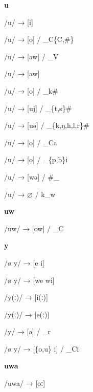 \begin{center}\textbf{u}\end{center}
\begin{multicols}{4}
\noindent /u/ → [i]

\noindent /u/ → [o] / \_C\{C,\#\}

\noindent /u/ → [əw] / \_V

\noindent /u/ → [aw]

\noindent /u/ → [o] / \_k\#

\noindent /u/ → [uj] / \_\{t,s\}\#

\noindent /u/ → [uə] / \_\{k,ŋ,h,l,r\}\#

\noindent /u/ → [o] / \_Ca

\noindent /u/ → [o] / \_\{p,b\}i

\noindent /u/ → [wə] / \#\_

\noindent /u/ → $\varnothing$ / k\_w
\end{multicols}

\begin{center}\textbf{uw}\end{center}
\begin{multicols}{4}
\noindent /uw/ → [ow] / \_C
\end{multicols}

\begin{center}\textbf{y}\end{center}
\begin{multicols}{4}
\noindent /ø y/ → [e i]

\noindent /ø y/ → [we wi]

\noindent /y(ː)/ → [i(ː)]

\noindent /y(ː)/ → [e(ː)]

\noindent /y/ → [ə] / \_r

\noindent /ø y/ → [\{o,u\} i] / \_Ci
\end{multicols}

\begin{center}\textbf{uwa}\end{center}
\begin{multicols}{4}
\noindent /uwa/ → [oː]
\end{multicols}


